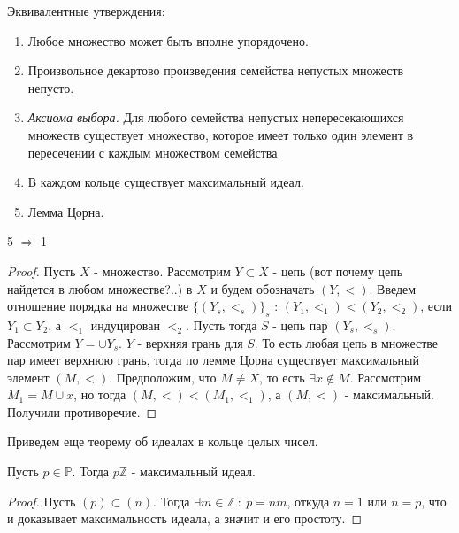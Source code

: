 \pagebreak

Эквивалентные утверждения:

\begin{enumerate}
  \item Любое множество может быть вполне упорядочено.
  \item Произвольное декартово произведения семейства непустых множеств непусто. 
  \item \emph{Аксиома выбора.} Для любого семейства непустых непересекающихся множеств существует множество, которое имеет
        только один элемент в пересечении с каждым множеством семейства
  \item В каждом кольце существует максимальный идеал.
  \item Лемма Цорна.
\end{enumerate}

\begin{thm}
  5 $ \Rightarrow $ 1
\end{thm}

\begin{proof}
  Пусть $ X $ - множество. Рассмотрим $ Y \subset X $ - цепь (вот почему цепь найдется в любом множестве?..) в $ X $ 
  и будем обозначать $ (Y, <) $. Введем отношение порядка
  на множестве $ \{ (Y_{s}, <_{s}) \}_s $ : $ (Y_{1}, <_{1}) < (Y_{2}, <_{2}) $, если $ Y_{1} \subset Y_{2} $, а $ <_{1} $ индуцирован $ <_{2} $.
  Пусть тогда $ S $ - цепь пар $ (Y_{s}, <_{s}) $. Рассмотрим $ Y = \cup{Y_{s}} $. $ Y $ - верхняя грань для $ S $. То есть любая цепь
  в множестве пар имеет верхнюю грань, тогда по лемме Цорна существует максимальный элемент $ (M, <) $. Предположим, что $ M \ne X $, то есть
  $ \exists x \notin M $. Рассмотрим $ M_{1} = M \cup {x} $, но тогда $ (M, <) < (M_{1}, <_{1}) $, а $ (M, <) $ - максимальный. Получили
  противоречие.
\end{proof}

Приведем еще теорему об идеалах в кольце целых чисел.

\begin{thm}
  Пусть $ p \in \mathbb{P} $. Тогда $ p\mathbb{Z} $ - максимальный идеал. 
\end{thm}

\begin{proof}
  Пусть $ (p) \subset (n) $. Тогда $ \exists m \in \mathbb{Z} ~ : ~ p = nm $, откуда
  $ n = 1 $ или $ n = p $, что и доказывает максимальность идеала, а значит и его простоту.
\end{proof}

